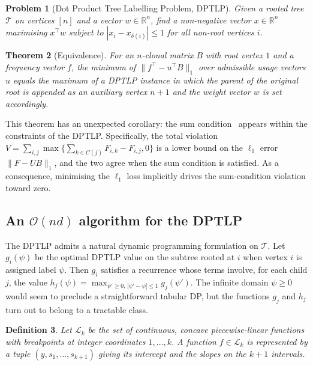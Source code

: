 \documentclass[11pt]{article}
\newtheorem{theorem}{Theorem}
\newtheorem{definition}[theorem]{Definition}
\newtheorem{problem}[theorem]{Problem}
\begin{document}
\begin{problem}[Dot Product Tree Labelling Problem, DPTLP]
Given a rooted tree $\mathcal{T}$ on vertices $[n]$ and a vector $w\in\mathbb{R}^n$, find a non-negative vector $x\in\mathbb{R}^n$ maximising $x^\top w$ subject to $|x_i - x_{\delta(i)}| \leq 1$ for all non-root vertices $i$.
\end{problem}

\begin{theorem}[Equivalence]
For an $n$-clonal matrix $B$ with root vertex $1$ and a frequency vector $f$, the minimum of $\|f^\top - u^\top B\|_1$ over admissible usage vectors $u$ equals the maximum of a DPTLP instance in which the parent of the original root is appended as an auxiliary vertex $n+1$ and the weight vector $w$ is set accordingly.
\end{theorem}

This theorem has an unexpected corollary: the sum condition~\citep{elkebir2015reconstruction,popic2015lichee,malikic2015citup} appears within the constraints of the DPTLP. Specifically, the total violation $V=\sum_{i,j}\max\{\sum_{k\in C(j)} F_{i,k} - F_{i,j}, 0\}$ is a lower bound on the $\ell_1$ error $\|F - UB\|_1$, and the two agree when the sum condition is satisfied. As a consequence, minimising the $\ell_1$ loss implicitly drives the sum-condition violation toward zero.

\subsection{An $\mathcal{O}(nd)$ algorithm for the DPTLP}

The DPTLP admits a natural dynamic programming formulation on $\mathcal{T}$. Let $g_i(\psi)$ be the optimal DPTLP value on the subtree rooted at $i$ when vertex $i$ is assigned label $\psi$. Then $g_i$ satisfies a recurrence whose terms involve, for each child $j$, the value $h_j(\psi) = \max_{\psi'\geq 0,\,|\psi' - \psi|\leq 1} g_j(\psi')$. The infinite domain $\psi \geq 0$ would seem to preclude a straightforward tabular DP, but the functions $g_j$ and $h_j$ turn out to belong to a tractable class.

\begin{definition}
Let $\mathcal{L}_k$ be the set of continuous, concave piecewise-linear functions with breakpoints at integer coordinates $1,\ldots,k$. A function $f\in\mathcal{L}_k$ is represented by a tuple $(y, s_1,\ldots,s_{k+1})$ giving its intercept and the slopes on the $k+1$ intervals.
\end{definition}
\end{document}
